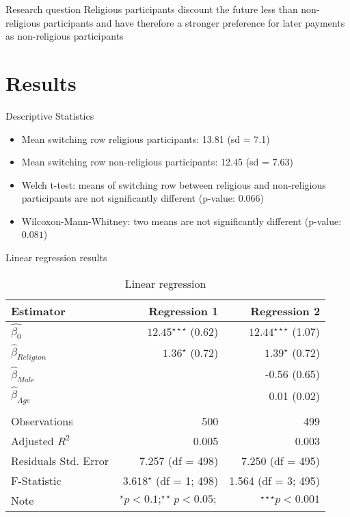 \documentclass[10pt]{beamer}
\begin{document}
\begin{frame}[fragile] {Research question} 
Religious participants discount the future less than non-religious participants and have therefore a stronger preference for later payments as non-religious participants
\end{frame}

\section{Results}

\begin{frame}[fragile] {Descriptive Statistics} 
\begin{itemize}
\item Mean switching row religious participants: 13.81 (sd = 7.1) \item Mean switching row non-religious participants: 12.45 (sd = 7.63)
\item Welch t-test: 
means of switching row between religious and non-religious participants are not significantly different (p-value: $0.066$)
\item Wilcoxon-Mann-Whitney: two means are not significantly different (p-value: $0.081$)
\end{itemize}
\end{frame}


\begin{frame}{Linear regression results}
  \begin{table}
    \caption{Linear regression}
    \begin{tabular}{lrr}
      \toprule
      Estimator & Regression 1 & Regression 2 \\
      \midrule
      $\hat{\beta_0}$ & $12.45^{\star\star\star}$ (0.62)& $12.44^{\star\star\star}$ (1.07) \\
      $\hat{\beta}_{Religion} $ & $1.36^\star$ (0.72) & $1.39^\star$ (0.72) \\
       $ \hat{\beta}_{Male}$ & & -0.56 (0.65)\\
      $ \hat{\beta}_{Age}$ & &0.01 (0.02) \\
      \\
      Observations &  500 & 499 \\
      Adjusted $R^2$ &  0.005  & 0.003\\
      Residuals Std. Error&   7.257 (df = 498) &7.250 (df = 495) \\
      F-Statistic & $3.618^\star$ (df = 1; 498)  & 1.564 (df = 3; 495) \\
\midrule
Note & $^\star p<0.1; ^{\star\star} p<0.05;$ & $ ^{\star\star\star} p<0.001$ \\
      \bottomrule
    \end{tabular}
\end{table}
\end{frame}
\end{document}
